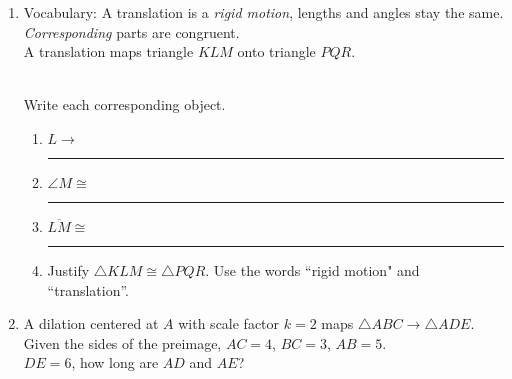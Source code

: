 \documentclass[12pt, twoside]{article}
\begin{document}
\begin{enumerate}
\newpage
\item Vocabulary: A translation is a \emph{rigid motion}, lengths and angles stay the same. \emph{Corresponding} parts are congruent. \\[0.5cm]
A translation maps triangle $KLM$ onto triangle $PQR$. \vspace{0.5cm}
    \begin{multicols}{2}
      \\
      Write each corresponding object.
      \begin{enumerate}
        \item $L \rightarrow$ \rule{2cm}{0.15mm}
        \item $\angle M \cong$ \rule{2cm}{0.15mm}
        \item $\overline {LM} \cong$ \rule{2cm}{0.15mm}
        \item Justify $\triangle KLM \cong \triangle PQR$. Use the words ``rigid motion" and ``translation''.
      \end{enumerate}
    \end{multicols}

\newpage
\item A dilation centered at $A$ with scale factor $k=2$ maps $\triangle ABC \rightarrow \triangle ADE$. Given the sides of the preimage, $AC = 4$, $BC = 3$, $AB = 5$. \\[0.5cm]
$DE = 6$, how long are $AD$ and $AE$?
    \begin{flushright}
    \end{flushright}


\end{enumerate}
\end{document}
